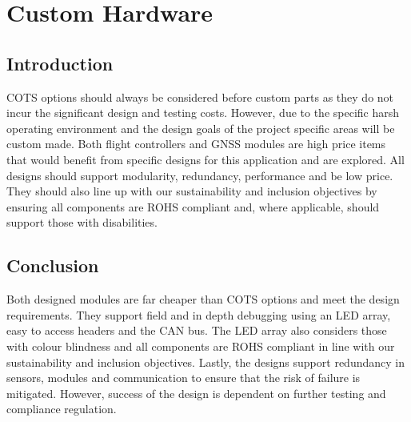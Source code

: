 \newpage
{}
\section{Custom Hardware} \label{section:Custom Hardware}
\subsection{Introduction}\label{sub_section:tgt_custom_hardware_intro}
\gls{COTS} options should always be considered before custom parts as they do not incur the significant design and testing costs. However, due to the specific harsh operating environment and the design goals of the project specific areas will be custom made. Both flight controllers and \gls{GNSS} modules are high price items that would benefit from specific designs for this application and are explored. All designs should support modularity, redundancy, performance and be low price. They should also line up with our sustainability and inclusion objectives by ensuring all components are \gls{ROHS} compliant and, where applicable, should support those with disabilities.





\subsection{Conclusion}
Both designed modules are far cheaper than \gls{COTS} options and meet the design requirements. They support field and in depth debugging using an \gls{LED} array, easy to access headers and the \gls{CAN} bus. The LED array also considers those with colour blindness and all components are \gls{ROHS} compliant in line with our sustainability and inclusion objectives. Lastly, the designs support redundancy in sensors, modules and communication to ensure that the risk of failure is mitigated. However, success of the design is dependent on further testing and compliance regulation.